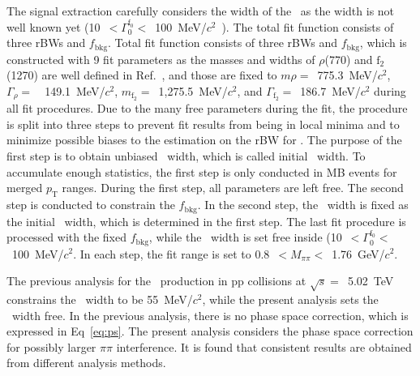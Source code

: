 The signal extraction carefully considers the width of the \fzero~as the width is not well known yet (10~$<\Gamma_{0}^{\mathrm{f}_{0}}<$~100~MeV/$c^{2}$~\cite{ParticleDataGroup:2020ssz}). The total fit function consists of three rBWs and $f_{\mathrm{bkg}}$. Total fit function consists of three rBWs and $f_{\mathrm{bkg}}$, which is constructed with 9 fit parameters as the masses and widths of $\rho$(770) and $\mathrm{f}_{2}$(1270) are well defined in Ref.~\cite{ParticleDataGroup:2020ssz}, and those are fixed to $m{\rho}=$~775.3~MeV/$c^{2}$, $\Gamma_{\rho}=$~~149.1~MeV/$c^{2}$, $m_{\mathrm{f}_{2}}=$~1,275.5~MeV/$c^{2}$, and $\Gamma_{\mathrm{f}_{2}}=$~186.7~MeV/$c^{2}$ during all fit procedures. Due to the many free parameters during the fit, the procedure is split into three steps to prevent fit results from being in local minima and to minimize possible biases to the estimation on the rBW for \fzero. The purpose of the first step is to obtain unbiased \fzero~width, which is called initial \fzero~width. To accumulate enough statistics, the first step is only conducted in MB events for merged $p_{\mathrm{T}}$ ranges. During the first step, all parameters are left free. The second step is conducted to constrain the $f_{\mathrm{bkg}}$. In the second step, the \fzero~width is fixed as the initial \fzero~width, which is determined in the first step. The last fit procedure is processed with the fixed $f_{\mathrm{bkg}}$, while the \fzero~width is set free inside (10~$<\Gamma_{0}^{\mathrm{f}_{0}}<$~100~MeV/$c^{2}$. In each step, the fit range is set to 0.8~$<M_{\pi\pi}<$~1.76~GeV/$c^{2}$.

The previous analysis for the \fzero~production in pp collisions at $\sqrt{s}=$~5.02~TeV~\cite{ALICE:2022qnb} constrains the \fzero~width to be 55~MeV/$c^{2}$, while the present analysis sets the \fzero~width free. In the previous analysis, there is no phase space correction, which is expressed in Eq~\ref{eq:ps}. The present analysis considers the phase space correction for possibly larger $\pi\pi$ interference. It is found that consistent results are obtained from different analysis methods.


